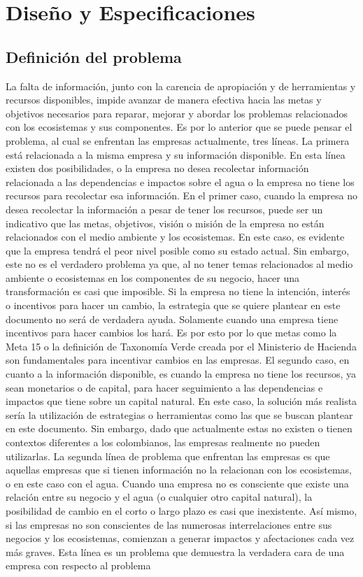 \section{Diseño y Especificaciones} \label{sec:definicion-especificaciones}

\subsection{Definición del problema}\label{subsec:definicion-problema}
La falta de información, junto con la carencia de apropiación y de herramientas y recursos disponibles, impide avanzar de manera efectiva hacia las metas y objetivos necesarios para reparar, mejorar y abordar los problemas relacionados con los ecosistemas y sus componentes. Es por lo anterior que se puede pensar el problema, al cual se enfrentan las empresas actualmente, tres líneas. La primera está relacionada a la misma empresa y su información disponible. En esta línea existen dos posibilidades, o la empresa no desea recolectar información relacionada a las dependencias e impactos sobre el agua o la empresa no tiene los recursos para recolectar esa información. En el primer caso, cuando la empresa no desea recolectar la información a pesar de tener los recursos, puede ser un indicativo que las metas, objetivos, visión o misión de la empresa no están relacionados con el medio ambiente y los ecosistemas. En este caso, es evidente que la empresa tendrá el peor nivel posible como su estado actual. Sin embargo, este no es el verdadero problema ya que, al no tener temas relacionados al medio ambiente o ecosistemas en los componentes de su negocio, hacer una transformación es casi que imposible. Si la empresa no tiene la intención, interés o incentivos para hacer un cambio, la estrategia que se quiere plantear en este documento no será de verdadera ayuda. Solamente cuando una empresa tiene incentivos para hacer cambios los hará. Es por esto por lo que metas como la Meta 15 o la definición de Taxonomía Verde creada por el Ministerio de Hacienda son fundamentales para incentivar cambios en las empresas. El segundo caso, en cuanto a la información disponible, es cuando la empresa no tiene los recursos, ya sean monetarios o de capital, para hacer seguimiento a las dependencias e impactos que tiene sobre un capital natural. En este caso, la solución más realista sería la utilización de estrategias o herramientas como las que se buscan plantear en este documento. Sin embargo, dado que actualmente estas no existen o tienen contextos diferentes a los colombianos, las empresas realmente no pueden utilizarlas. La segunda línea de problema que enfrentan las empresas es que aquellas empresas que si tienen información no la relacionan con los ecosistemas, o en este caso con el agua. Cuando una empresa no es consciente que existe una relación entre su negocio y el agua (o cualquier otro capital natural), la posibilidad de cambio en el corto o largo plazo es casi que inexistente. Así mismo, si las empresas no son conscientes de las numerosas interrelaciones entre sus negocios y los ecosistemas, comienzan a generar impactos y afectaciones cada vez más graves. Esta línea es un problema que demuestra la verdadera cara de una empresa con respecto al problema 